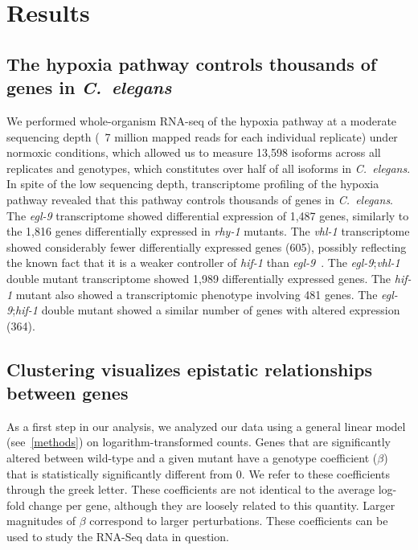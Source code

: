 \documentclass[9pt,twocolumn,twoside]{pnas-new}
\newcommand{\cel}{\emph{C.~elegans}}
\newcommand{\egl}{\emph{egl-9}}
\newcommand{\rhy}{\emph{rhy-1}}
\newcommand{\vhl}{\emph{vhl-1}}
\newcommand{\hif}{\emph{hif-1}}
\newcommand{\egln}{1,487}
\newcommand{\rhyn}{1,816}
\newcommand{\vhln}{605}
\newcommand{\eglvhln}{1,989}
\newcommand{\hifn}{481}
\newcommand{\eglhifn}{364}
\begin{document}
\section*{Results}
\subsection*{The hypoxia pathway controls thousands of genes in \cel{}}
\label{sub:summary}

We performed whole-organism RNA-seq of the hypoxia pathway at a moderate
sequencing depth (~7 million mapped reads for each individual replicate) under
normoxic conditions, which allowed us to measure 13,598 isoforms across all
replicates and genotypes, which constitutes over half of all isoforms in \cel{}.
In spite of the low sequencing depth, transcriptome profiling of the hypoxia
pathway revealed that this pathway controls thousands of genes in \cel{}. The
\egl{} transcriptome showed differential expression of \egln{} genes, similarly to
the \rhyn{} genes differentially expressed in \rhy{} mutants. The \vhl{}
transcriptome showed considerably fewer differentially expressed genes (\vhln{}),
possibly reflecting the known fact that it is a weaker controller of \hif{} than
\egl{}~\cite{Shao2009}. The \egl{};\vhl{} double mutant transcriptome showed
\eglvhln{} differentially expressed genes. The \hif{} mutant also showed a
transcriptomic phenotype involving \hifn{} genes. The \egl{};\hif{} double mutant
showed a similar number of genes with altered expression (\eglhifn{}).

\subsection*{Clustering visualizes epistatic relationships between genes}
\label{sub:Clustering}

As a first step in our analysis, we analyzed our data using a general
linear model (see~\ref{methods}) on logarithm-transformed
counts. Genes that are significantly altered between wild-type and a given
mutant have a genotype coefficient ($\beta$) that is statistically significantly
different from 0. We refer to these coefficients through the greek letter. These
coefficients are not identical to the average log-fold change per gene, although
they are loosely related to this quantity. Larger magnitudes of $\beta$
correspond to larger perturbations. These coefficients can be used to study the
RNA-Seq data in question.
\end{document}
